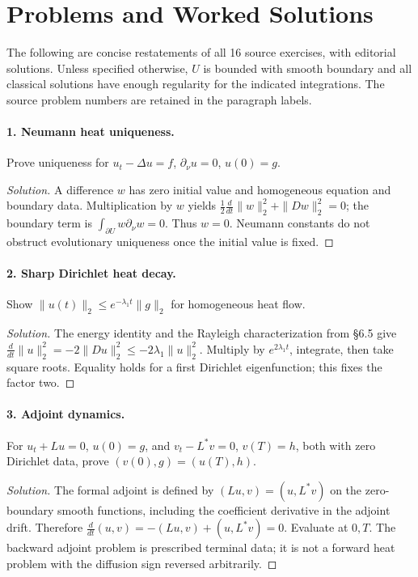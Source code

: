\Needspace{60mm}
\Needspace{55mm}
\section{Problems and Worked Solutions}
\label{sec:7-5}
The following are concise restatements of all 16 source exercises, with
editorial solutions. Unless specified otherwise, $U$ is bounded with smooth
boundary and all classical solutions have enough regularity for the indicated
integrations. The source problem numbers are retained in the paragraph labels.

\Needspace{30mm}
\paragraph{1. Neumann heat uniqueness.}
Prove uniqueness for $u_t-\Delta u=f$, $\partial_\nu u=0$, $u(0)=g$.
\begin{proof}[Solution]
A difference $w$ has zero initial value and homogeneous equation and boundary
data. Multiplication by $w$ yields
$\frac12\frac d{dt}\|w\|_2^2+\|Dw\|_2^2=0$; the boundary term is
$\int_{\partial U}w\partial_\nu w=0$. Thus $w=0$. Neumann constants do
not obstruct evolutionary uniqueness once the initial value is fixed.
\end{proof}

\Needspace{30mm}
\paragraph{2. Sharp Dirichlet heat decay.}
Show $\|u(t)\|_2\leq e^{-\lambda_1t}\|g\|_2$ for homogeneous heat flow.
\begin{proof}[Solution]
The energy identity and the Rayleigh characterization from
\S6.5 give
$\frac d{dt}\|u\|_2^2=-2\|Du\|_2^2\leq-2\lambda_1\|u\|_2^2$.
Multiply by $e^{2\lambda_1t}$, integrate, then take square roots.
Equality holds for a first Dirichlet eigenfunction; this fixes the factor two.
\end{proof}
\Needspace{55mm}

\Needspace{30mm}
\paragraph{3. Adjoint dynamics.}
For $u_t+Lu=0$, $u(0)=g$, and $v_t-L^*v=0$, $v(T)=h$, both with
zero Dirichlet data, prove $(v(0),g)=(u(T),h)$.
\begin{proof}[Solution]
The formal adjoint is defined by $(Lu,v)=(u,L^*v)$ on the zero-boundary
smooth functions, including the coefficient derivative in the adjoint drift.
Therefore $\frac d{dt}(u,v)=-(Lu,v)+(u,L^*v)=0$.
Evaluate at $0,T$. The backward adjoint problem is prescribed terminal data;
it is not a forward heat problem with the diffusion sign reversed arbitrarily.
\end{proof}

